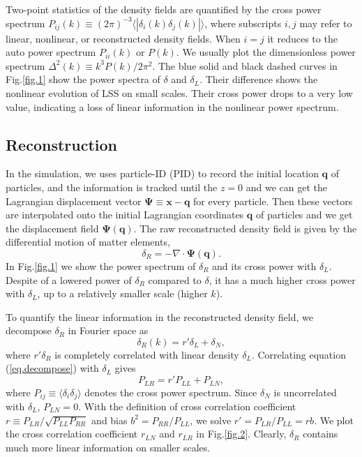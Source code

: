 \documentclass[aps,prd,twocolumn,superscriptaddress,amsfont,amssymb,amsmath,nofootinbib,showpacs,balancelastpage]{revtex4-1}
\newcommand{\bs}{\boldsymbol}
\begin{document}
Two-point statistics of the density fields are quantified by the cross power spectrum $P_{ij}(k)\equiv(2\pi)^{-3}\langle|\delta_i(k)\delta_j(k)|\rangle$, where subscripts $i,j$ may refer to linear, nonlinear, or reconstructed density fields. When $i=j$ it reduces to the auto power spectrum $P_{ii}(k)$ or $P(k)$. We usually plot the dimensionless power spectrum $\Delta^2(k)\equiv k^3P(k)/2\pi^2$. The blue solid and black dashed curves in Fig.\ref{fig.1} show the power spectra of $\delta$ and $\delta_L$. Their difference shows the nonlinear evolution of LSS on small scales. Their cross power drops to a very low value, indicating a loss of linear information in the nonlinear power spectrum.

\subsection{Reconstruction}
In the simulation, we uses particle-ID (PID) to record the initial location ${\bs q}$ of particles, and the information is tracked until the $z=0$ and we can get the Lagrangian displacement vector ${\bs \Psi}\equiv{\bs x}-{\bs q}$ for every particle. Then these vectors are interpolated onto the initial Lagrangian coordinates ${\bs q}$ of particles and we get the displacement field ${\bs \Psi}({\bs q})$.
The raw reconstructed density field is given by the differential motion of matter elements,
\begin{equation}
    \delta_R=-\nabla\cdot{\bs \Psi}({\bs q}).
\end{equation}
In Fig.\ref{fig.1} we show the power spectrum of $\delta_R$ and its cross power with $\delta_L$. Despite of a lowered power of $\delta_R$ compared to $\delta$, it has a much higher cross power with $\delta_L$, up to a relatively smaller scale (higher $k$).


To quantify the linear information in the reconstructed density field, we decompose $\delta_R$ in Fourier space as
\begin{equation}\label{eq.decompose}
    \delta_R(k)=r'\delta_L+\delta_N,
\end{equation}
where $r'\delta_R$ is completely correlated with linear density $\delta_L$. Correlating equation (\ref{eq.decompose}) with $\delta_L$ gives
\begin{equation}
    P_{LR}=r'P_{LL}+P_{LN},
\end{equation}
where $P_{ij}\equiv\langle\delta_i\delta_j\rangle$ denotes the cross power spectrum. Since $\delta_N$ is uncorrelated with $\delta_L$, $P_{LN}=0$. With the definition of cross correlation coefficient $r\equiv P_{LR}/\sqrt{P_{LL}P_{RR}}$ and bias $b^2=P_{RR}/P_{LL}$, we solve $r'=P_{LR}/P_{LL}=rb$. We plot the cross correlation coefficient $r_{LN}$ and $r_{LR}$ in Fig.\ref{fig.2}. Clearly, $\delta_R$ contains much more linear information on smaller scales.
\end{document}
